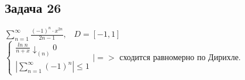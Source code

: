 \documentclass[a4paper, fleqn]{article}
\begin{document}
    \subsection*{Задача 26}
    $\sum\limits_{n = 1}^{\infty} \frac{(-1)^n \cdot x^{2n}}{2n - 1}, \; \; \; D = [-1, 1]$ \\
    $\begin{cases} \frac{ln\; n}{n + x} \downarrow_{(n)} 0 \\ \left|\sum\limits_{n = 1}^{\infty} (-1)^n\right| \leq 1 \end{cases} \bigg| => $ сходится равномерно по Дирихле. \\
    
    
    
\end{document}
